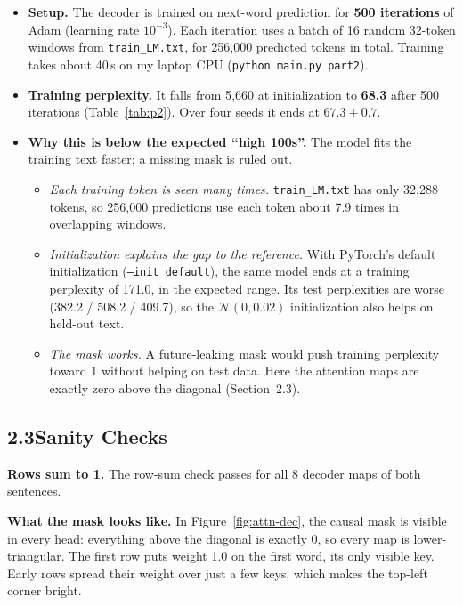 \documentclass[11pt]{article}
\newcommand{\code}[1]{\texttt{#1}}
\begin{document}
\begin{itemize}
  \item \textbf{Setup.} The decoder is trained on next-word prediction for \textbf{500 iterations} of Adam (learning rate $10^{-3}$). Each iteration uses a batch of 16 random 32-token windows from \code{train\_LM.txt}, for 256{,}000 predicted tokens in total. Training takes about 40\,s on my laptop CPU (\code{python main.py part2}).
  \item \textbf{Training perplexity.} It falls from 5{,}660 at initialization to \textbf{68.3} after 500 iterations (Table~\ref{tab:p2}). Over four seeds it ends at $67.3 \pm 0.7$.
  \item \textbf{Why this is below the expected ``high 100s''.} The model fits the training text faster; a missing mask is ruled out.
  \begin{itemize}
    \item \emph{Each training token is seen many times.} \code{train\_LM.txt} has only 32{,}288 tokens, so 256{,}000 predictions use each token about 7.9 times in overlapping windows.
    \item \emph{Initialization explains the gap to the reference.} With PyTorch's default initialization (\code{--init default}), the same model ends at a training perplexity of 171.0, in the expected range. Its test perplexities are worse (382.2 / 508.2 / 409.7), so the $\mathcal{N}(0, 0.02)$ initialization also helps on held-out text.
    \item \emph{The mask works.} A future-leaking mask would push training perplexity toward 1 without helping on test data. Here the attention maps are exactly zero above the diagonal (Section~2.3).
  \end{itemize}
\end{itemize}

\subsection*{2.3\quad Sanity Checks}

\textbf{Rows sum to 1.} The row-sum check passes for all 8 decoder maps of both sentences.

\textbf{What the mask looks like.} In Figure~\ref{fig:attn-dec}, the causal mask is visible in every head: everything above the diagonal is exactly 0, so every map is lower-triangular. The first row puts weight 1.0 on the first word, its only visible key. Early rows spread their weight over just a few keys, which makes the top-left corner bright.
\end{document}
